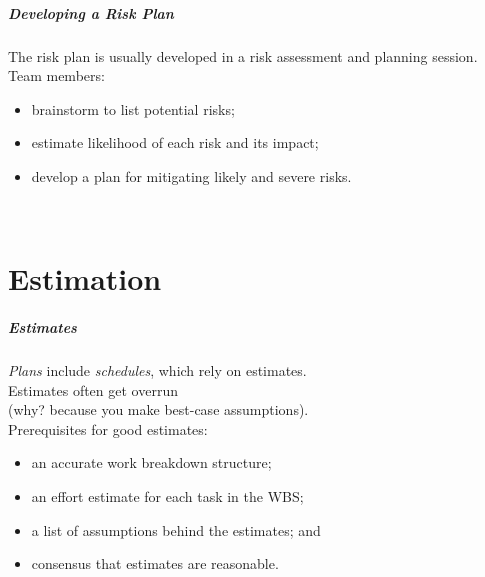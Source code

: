 \begin{frame}
\frametitle{Developing a Risk Plan}

\begin{changemargin}{1cm}

The risk plan is usually developed in a risk assessment and planning session.
Team members:
\begin{itemize}
\item \alert{brainstorm} to list potential risks;
\item \alert{estimate} likelihood of each risk and its impact;
\item \alert{develop} a plan for mitigating likely and severe risks.
\end{itemize}

~\\

\end{changemargin}

\end{frame}

\part{Estimation}
\frame{\partpage}

\begin{frame}
\frametitle{Estimates}

\begin{changemargin}{1cm}

\emph{Plans} include \emph{schedules}, which rely on \alert{estimates}.\\[1em]

Estimates often get overrun\\ (why? because you make best-case assumptions).\\[1em]

Prerequisites for good estimates:
\begin{itemize}
\item an accurate work breakdown structure;
\item an effort estimate for each task in the WBS;
\item a list of assumptions behind the estimates; and
\item consensus that estimates are reasonable.
\end{itemize}

\end{changemargin}

\end{frame}


